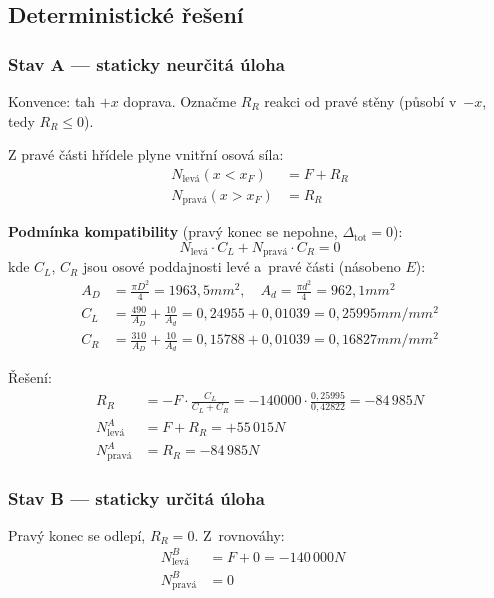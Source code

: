 \subsection{Deterministické řešení}

\subsubsection{Stav A — staticky neurčitá úloha}

Konvence: tah $+x$ doprava. Označme $R_R$ reakci od pravé stěny (působí v~$-x$, tedy $R_R \le 0$).

Z pravé části hřídele plyne vnitřní osová síla:
\begin{align}
    N_{\mathrm{levá}}(x < x_F) &= F + R_R \\
    N_{\mathrm{pravá}}(x > x_F) &= R_R
\end{align}

\textbf{Podmínka kompatibility} (pravý konec se nepohne, $\Delta_{\mathrm{tot}} = 0$):
\begin{equation}
    N_{\mathrm{levá}} \cdot C_L + N_{\mathrm{pravá}} \cdot C_R = 0
\end{equation}
kde $C_L$, $C_R$ jsou osové poddajnosti levé a~pravé části (násobeno $E$):
\begin{align}
    A_D &= \frac{\pi D^2}{4} = 1963{,}5\unit{mm^2}, \quad A_d = \frac{\pi d^2}{4} = 962{,}1\unit{mm^2} \\
    C_L &= \frac{490}{A_D} + \frac{10}{A_d} = 0{,}24955 + 0{,}01039 = 0{,}25995\unit{mm/mm^2} \\
    C_R &= \frac{310}{A_D} + \frac{10}{A_d} = 0{,}15788 + 0{,}01039 = 0{,}16827\unit{mm/mm^2}
\end{align}

Řešení:
\begin{align}
    R_R &= -F \cdot \frac{C_L}{C_L + C_R} = -140000 \cdot \frac{0{,}25995}{0{,}42822} = -84\,985\unit{N} \\
    N_{\mathrm{levá}}^A &= F + R_R = +55\,015\unit{N} \quad \\
    N_{\mathrm{pravá}}^A &= R_R = -84\,985\unit{N} \quad
\end{align}

\subsubsection{Stav B — staticky určitá úloha}

Pravý konec se odlepí, $R_R = 0$. Z~rovnováhy:
\begin{align}
    N_{\mathrm{levá}}^B &= F + 0 = -140\,000\unit{N} \quad \\
    N_{\mathrm{pravá}}^B &= 0
\end{align}

